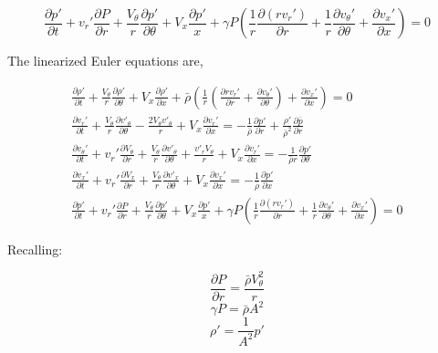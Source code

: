 \begin{equation*}
\boxed{\frac{\partial p '}{\partial t} + v_r'\frac{\partial P}{\partial r} + \frac{V_{\theta}}{r}\frac{\partial p'}{\partial \theta} + V_x\frac{\partial p'}{x} + \gamma P \left(\frac{1}{r}\frac{\partial (r v_r')}{\partial r} + \frac{1}{r} \frac{\partial v_{\theta}'}{\partial \theta} + \frac{\partial v_x'}{\partial x}\right) = 0}
\end{equation*}
\newpage

The linearized Euler equations are,

\begin{align*}
\frac{\partial \rho'}{\partial t} +
\frac{V_{\theta}}{r}
\frac{\partial \rho'}{\partial \theta} + 
V_x
\frac{\partial \rho'}{\partial x} +
\bar{\rho}
\left(
\frac{1}{r}
\left(
\frac{\partial r v_r'}{\partial r} + \frac{\partial v_{\theta}'}{\partial \theta}		 
\right) +
\frac{\partial v_x'}{\partial x}
\right)= 0\\
\frac{\partial  v_r' }{\partial t} +
\frac{V_{\theta}}{r} \frac{\partial v'_{\theta}}{\partial \theta} -
\frac{2V_{\theta}v'_{\theta}}{r} +
V_x \frac{\partial v_r'}{\partial x} = -\frac{1    }{\bar{\rho}}  \frac{\partial p'}{\partial r} +
\frac{\rho'}{\bar{\rho}^2}\frac{\partial \bar{p}}{\partial r}\\
\frac{\partial  v_{\theta}' }{\partial t} +
v_r' \frac{\partial  V_{\theta}  }{\partial r} +
\frac{V_{\theta}}{r} \frac{\partial v'_{\theta}}{\partial \theta} +
\frac{v'_rV_{\theta}}{r} +
V_x \frac{\partial v_r'}{\partial x} 
= -\frac{1}{\bar{\rho} r}	\frac{\partial p'}{\partial \theta}\\
\frac{\partial  v_x' }{\partial t} +
v_r' \frac{\partial  V_x  }{\partial r} +
\frac{V_{\theta}}{r} \frac{\partial v'_x}{\partial \theta} +
V_x \frac{\partial v_x'}{\partial x} 
= -\frac{1    }{\bar{\rho}}  \frac{\partial p'}{\partial x} \\
\frac{\partial p '}{\partial t} +
v_r'\frac{\partial P}{\partial r} + 
\frac{V_{\theta}}{r}\frac{\partial p'}{\partial \theta} + 
V_x\frac{\partial p'}{x} + 
\gamma P \left(\frac{1}{r}\frac{\partial (r v_r')}{\partial r} + 
\frac{1}{r} \frac{\partial v_{\theta}'}{\partial \theta} + \frac{\partial v_x'}{\partial x}\right) = 0
\end{align*}


Recalling:

\[\frac{\partial P}{\partial r} = \frac{\bar{\rho} V_{\theta}^2}{r} \]
\[\gamma P  = \bar{\rho}A^2\]
\[\rho' = \frac{1}{A^2} p'\]

